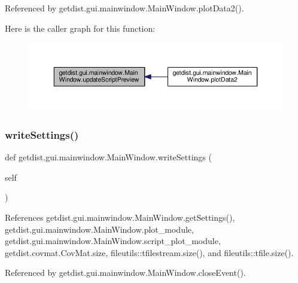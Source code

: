 Referenced by getdist.\+gui.\+mainwindow.\+Main\+Window.\+plot\+Data2().

Here is the caller graph for this function\+:
\nopagebreak
\begin{figure}[H]
\begin{center}
\leavevmode
\includegraphics[width=350pt]{classgetdist_1_1gui_1_1mainwindow_1_1MainWindow_a477f7c9959bc8d12d59af3d102767847_icgraph}
\end{center}
\end{figure}
\mbox{\label{classgetdist_1_1gui_1_1mainwindow_1_1MainWindow_ac5712470b76dd04c734584cbc7da1111}} 
\subsubsection{\texorpdfstring{write\+Settings()}{writeSettings()}}
{\footnotesize\ttfamily def getdist.\+gui.\+mainwindow.\+Main\+Window.\+write\+Settings (\begin{DoxyParamCaption}\item[{}]{self }\end{DoxyParamCaption})}



References getdist.\+gui.\+mainwindow.\+Main\+Window.\+get\+Settings(), getdist.\+gui.\+mainwindow.\+Main\+Window.\+plot\+\_\+module, getdist.\+gui.\+mainwindow.\+Main\+Window.\+script\+\_\+plot\+\_\+module, getdist.\+covmat.\+Cov\+Mat.\+size, fileutils\+::tfilestream.\+size(), and fileutils\+::tfile.\+size().



Referenced by getdist.\+gui.\+mainwindow.\+Main\+Window.\+close\+Event().

